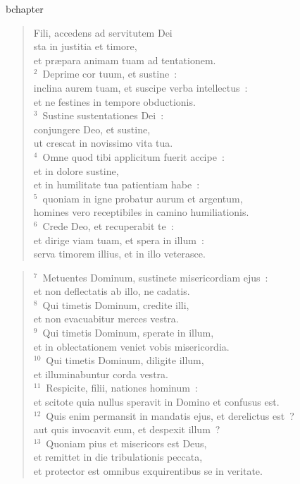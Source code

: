 bchapter\begin{verse}\vspace{-19pt}Fili, accedens ad servitutem Dei\\ sta in justitia et timore,\\ et pr\ae para animam tuam ad tentationem.\\
${}^{2}$~Deprime cor tuum, et sustine~:\\ inclina aurem tuam, et suscipe verba intellectus~:\\ et ne festines in tempore obductionis.\\
${}^{3}$~Sustine sustentationes Dei~:\\ conjungere Deo, et sustine,\\ ut crescat in novissimo vita tua.\\
${}^{4}$~Omne quod tibi applicitum fuerit accipe~:\\ et in dolore sustine,\\ et in humilitate tua patientiam habe~:\\
${}^{5}$~quoniam in igne probatur aurum et argentum,\\ homines vero receptibiles in camino humiliationis.\\
${}^{6}$~Crede Deo, et recuperabit te~:\\ et dirige viam tuam, et spera in illum~:\\ serva timorem illius, et in illo veterasce.\end{verse}


\begin{verse}${}^{7}$~Metuentes Dominum, sustinete misericordiam ejus~:\\ et non deflectatis ab illo, ne cadatis.\\
${}^{8}$~Qui timetis Dominum, credite illi,\\ et non evacuabitur merces vestra.\\
${}^{9}$~Qui timetis Dominum, sperate in illum,\\ et in oblectationem veniet vobis misericordia.\\
${}^{10}$~Qui timetis Dominum, diligite illum,\\ et illuminabuntur corda vestra.\\
${}^{11}$~Respicite, filii, nationes hominum~:\\ et scitote quia nullus speravit in Domino et confusus est.\\
${}^{12}$~Quis enim permansit in mandatis ejus, et derelictus est~?\\ aut quis invocavit eum, et despexit illum~?\\
${}^{13}$~Quoniam pius et misericors est Deus,\\ et remittet in die tribulationis peccata,\\ et protector est omnibus exquirentibus se in veritate.\end{verse}


